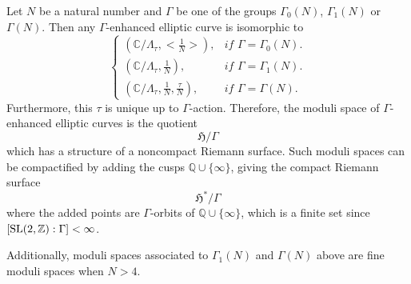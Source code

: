 \documentclass[a4paper,11pt]{article}
\begin{document}
\begin{thm}
Let $N$ be a natural number and $\Gamma$ be one of the groups $\Gamma_0(N)$, $\Gamma_1(N)$ or $\Gamma(N)$.
Then any $\Gamma$-enhanced elliptic curve is isomorphic to 
\[
\begin{cases}
(\mathbb{C}/\Lambda_{\tau},<\frac{1}{N}>), &\textit{if  }\Gamma=\Gamma_0(N).\\
(\mathbb{C}/\Lambda_{\tau},\frac{1}{N}), &\textit{if  }\Gamma=\Gamma_1(N).\\
(\mathbb{C}/\Lambda_{\tau},\frac{1}{N},\frac{\tau}{N}),  &\textit{if  }\Gamma=\Gamma(N).
\end{cases}
\]
Furthermore, this $\tau$ is unique up to  $\Gamma$-action.
Therefore, the moduli space of  $\Gamma$-enhanced elliptic curves is the quotient
\[
\mathfrak{H}/\Gamma
\]
which has a structure of a noncompact Riemann surface.
Such moduli spaces can be compactified by adding the cusps $\mathbb{Q}\cup\{\infty\}$, giving the compact Riemann surface
\[
\mathfrak{H}^*/\Gamma
\]
where the added points are $\Gamma$-orbits of $\mathbb{Q}\cup\{\infty\}$, which is a finite set since $[\textnormal{SL}(2,\mathbb{Z}):\Gamma]<\infty$.
\end{thm}

Additionally, moduli spaces associated to $\Gamma_1(N)$ and $\Gamma(N)$ above are fine moduli spaces when $N>4$.
\end{document}
